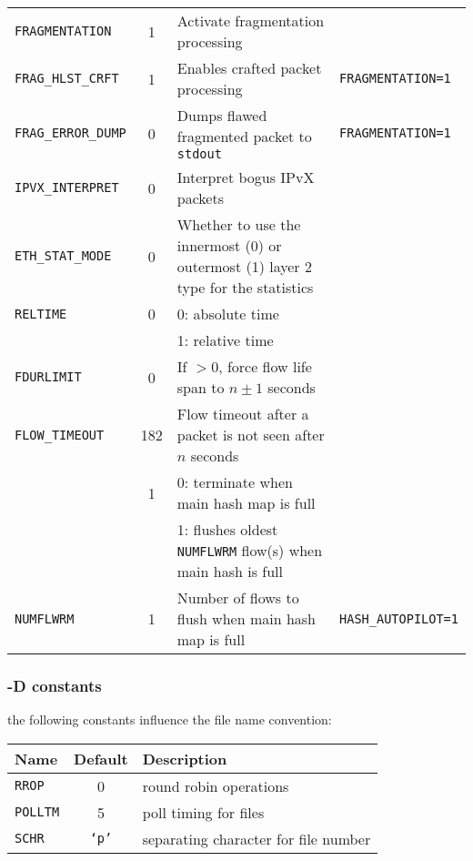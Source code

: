 \begin{center}
\begin{tabularx}{\textwidth}{lcXl}
        {\tt FRAGMENTATION}     & 1   & Activate fragmentation processing\\
        {\tt FRAG\_HLST\_CRFT}  & 1   & Enables crafted packet processing & {\tt FRAGMENTATION=1}\\
        {\tt FRAG\_ERROR\_DUMP} & 0   & Dumps flawed fragmented packet to {\tt stdout} & {\tt FRAGMENTATION=1}\\
        {\tt IPVX\_INTERPRET}   & 0   & Interpret bogus IPvX packets\\
        {\tt ETH\_STAT\_MODE}   & 0   & Whether to use the innermost (0) or outermost (1) layer 2 type for the statistics\\
        {\tt RELTIME}           & 0   & 0: absolute time\\
                                &     & 1: relative time\\
        {\tt FDURLIMIT}         & 0   & If $>0$, force flow life span to $n\pm1$ seconds\\
        {\tt FLOW\_TIMEOUT}     & 182 & Flow timeout after a packet is not seen after $n$ seconds\\

        {\tt \nameref{hash_autopilot}} & 1 & 0: terminate when main hash map is full\\
                                       &   & 1: flushes oldest {\tt NUMFLWRM} flow(s) when main hash is full\\
        {\tt NUMFLWRM}                 & 1 & Number of flows to flush when main hash map is full & {\tt HASH\_AUTOPILOT=1}\\
        \bottomrule
    \end{tabularx}
\end{center}

\subsubsection{-D constants}
the following constants influence the file name convention:

\begin{longtable}{lcl}
    \toprule
    {\bf Name} & {\bf Default} & {\bf Description}\\
    \midrule\endhead%
    {\tt RROP} & 0 & round robin operations \\
    {\tt POLLTM} & 5 & poll timing for files \\
    {\tt SCHR} & {\tt `p'} & separating character for file number \\
    \bottomrule
\end{longtable}

